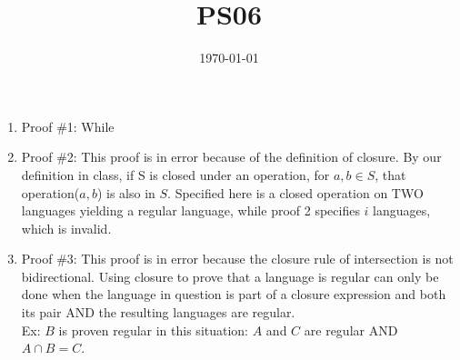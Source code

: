 \documentclass{article}
\title{PS06}
\date{\today}
\begin{document}
\maketitle

\begin{enumerate}[label=\alph*.]
	\item Proof \#1: While 
	\item Proof \#2: This proof is in error because of the definition of closure. By our definition in class, if S is closed under an operation, for $a, b \in S$, that operation($a,b$) is also in $S$. Specified here is a closed operation on TWO languages yielding a regular language, while proof 2 specifies $i$ languages, which is invalid.
	\item Proof \#3: This proof is in error because the closure rule of intersection is not bidirectional. Using closure to prove that a language is regular can only be done when the language in question is part of a closure expression and both its pair AND the resulting languages are regular. \\Ex: $B$ is proven regular in this situation: $A$ and $C$ are regular AND $A \cap B = C$.
\end{enumerate}
\end{document}
